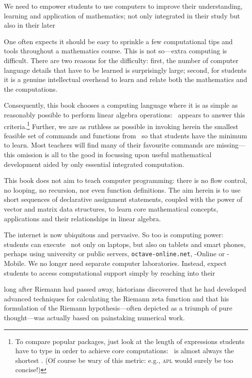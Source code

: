 We need to empower students to use computers to improve their understanding, learning and application of mathematics; not only integrated in their study but also in their later 

One often expects it should be easy to sprinkle a few computational tips and tools throughout a mathematics course.
This is not so---extra computing is difficult.
There are two reasons for the difficulty: 
first, the number of computer language details that have to be learned is surprisingly large;
second, for students it is a genuine intellectual overhead to learn and relate both the mathematics and the computations.

Consequently, this book chooses a computing language where it is as simple as reasonably possible to perform linear algebra operations: \script\ appears to answer this criteria.\footnote{To compare popular packages, just look at the length of expressions students have to type in order to achieve core computations: \script\ is almost always the shortest \cite[e.g.]{Nakos1998}.  
(Of course be wary of this metric: e.g., \textsc{apl} would surely be too concise!)}
Further, we are as ruthless as possible in invoking herein the smallest feasible set of commands and functions from \script\ so that  students have the minimum to learn.
Most teachers will find many of their favourite commands are missing---this omission is all to the good in focussing upon useful mathematical development aided by only essential integrated computation.

This book does not aim to teach computer programming: there is no flow control, no looping, no recursion, nor even function definitions.
The aim herein is to use short sequences of declarative assignment statements, coupled with the power of vector and matrix data structures, to learn core mathematical concepts, applications and their relationships in linear algebra. 

The internet is now ubiquitous and pervasive. 
So too is computing power: students can execute \script\ not only on laptops, but also on tablets and smart phones, perhaps using university or public servers, \verb|octave-online.net|, \script[1]-Online or \script[1]-Mobile. 
We no longer need separate computer laboratories.
Instead, expect students to access computational support simply by reaching into their 

\begin{quoted}{\cite{Donoho2015}}
long after Riemann had passed away, historians discovered that he had developed advanced techniques for calculating the Riemann zeta function and that his formulation of the Riemann hypothesis---often depicted as a triumph of pure thought---was actually based on painstaking numerical work.
\end{quoted}







